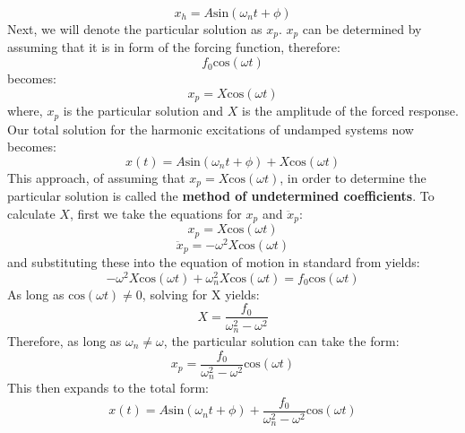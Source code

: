 \documentclass[12pt,letter]{article}
\numberwithin{ex}{section} %
\numberwithin{re}{section} %
\numberwithin{pr}{section} %
\begin{document}
			\begin{equation}
				x_h = A\text{sin}(\omega_n t + \phi)
			\end{equation}			
			Next, we will denote the particular solution as $x_p$. $x_p$ can be determined by assuming that it is in form of the forcing function, therefore:
			\begin{equation}
				f_0\text{cos}(\omega t)
			\end{equation}	
			becomes:
			\begin{equation}
				x_p  =X\text{cos}(\omega t)
			\end{equation}						
			where, $x_p$ is the particular solution and $X$ is the amplitude of the forced response. Our total solution for the harmonic excitations of undamped systems now becomes:
			\begin{equation}
				x(t) = A\text{sin}(\omega_n t + \phi) + X\text{cos}(\omega t) 
			\end{equation}				
			This approach, of assuming that $x_p=X\text{cos}(\omega t)$, in order to determine the particular solution is called the \textbf{method of undetermined coefficients}. To calculate $X$, first we take the equations for $x_p$ and $\ddot{x}_p $:
			\begin{equation}
				x_p = X\text{cos}(\omega t)
			\end{equation}	
			\begin{equation}
				\ddot{x}_p = -\omega^2X\text{cos}(\omega t)
			\end{equation}				
			and substituting these into the equation of motion in standard from yields:
			\begin{equation}
				-\omega^2X\text{cos}(\omega t)+\omega_n^2X\text{cos}(\omega t) = f_0\text{cos}(\omega t)
			\end{equation}		
			As long as 	$\text{cos}(\omega t) \neq  0$, solving for X yields:
			\begin{equation}
				X = \frac{f_0}{\omega_n^2-\omega^2}
				\label{eq:X}
			\end{equation}		
			Therefore, as long as $\omega_n \neq \omega$, the particular solution can take the form:
			\begin{equation}
				x_p = \frac{f_0}{\omega_n^2-\omega^2}\text{cos}(\omega t)
			\end{equation}						
			This then expands to the total form:
			\begin{equation}
				x(t) = A\text{sin}(\omega_n t + \phi) + \frac{f_0}{\omega_n^2-\omega^2}\text{cos}(\omega t)
			\end{equation}				
\end{document}
